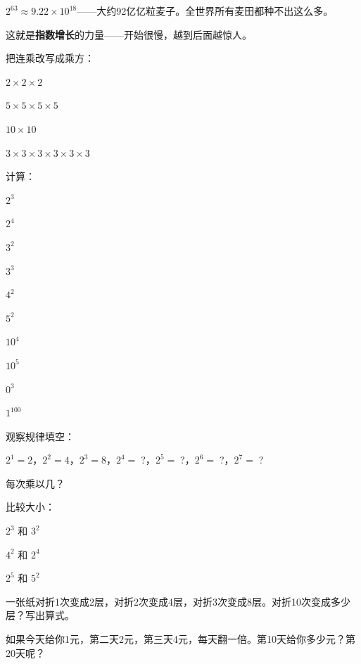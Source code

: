 $2^{63} \approx 9.22\times10^{18}$——大约92亿亿粒麦子。全世界所有麦田都种不出这么多。

这就是\textbf{指数增长}的力量——开始很慢，越到后面越惊人。

\begin{exercise}
\item 把连乘改写成乘方：
  \begin{subexercise}
    \item $2\times2\times2$
    \item $5\times5\times5\times5$
    \item $10\times10$
    \item $3\times3\times3\times3\times3\times3$
  \end{subexercise}

\item 计算：
  \begin{subexercise}
    \item $2^3$
    \item $2^4$
    \item $3^2$
    \item $3^3$
    \item $4^2$
    \item $5^2$
    \item $10^4$
    \item $10^5$
    \item $0^3$
    \item $1^{100}$
  \end{subexercise}

\item 观察规律填空：
  \begin{subexercise}
    \item $2^1=2$，$2^2=4$，$2^3=8$，$2^4=\;$?，$2^5=\;$?，$2^6=\;$?，$2^7=\;$?
    \item 每次乘以几？
  \end{subexercise}

\item 比较大小：
  \begin{subexercise}
    \item $2^3$ 和 $3^2$
    \item $4^2$ 和 $2^4$
    \item $2^5$ 和 $5^2$
  \end{subexercise}

\item 一张纸对折1次变成2层，对折2次变成4层，对折3次变成8层。对折10次变成多少层？写出算式。

\item 如果今天给你1元，第二天2元，第三天4元，每天翻一倍。第10天给你多少元？第20天呢？
\end{exercise}

